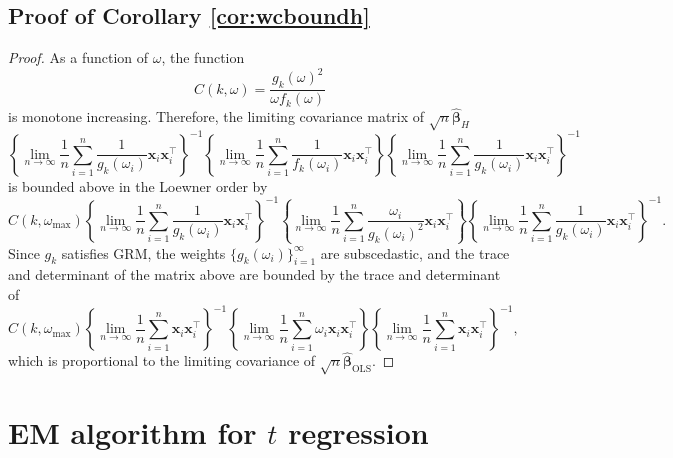 \documentclass[12pt]{article}
\newcommand{\bl}[1]{{\mathbf #1}}
\newcommand{\bs}[1]{\boldsymbol #1}
\begin{document}
\subsection{{Proof of Corollary \ref{cor:wcboundh}}}

\begin{proof}
    As a function of $\omega$, the function
    \begin{equation*}
        C(k, \omega) =\frac{g_{k}(\omega)^2}{\omega f_{k}(\omega)}
    \end{equation*}
    is monotone increasing. Therefore, the limiting covariance matrix of $\sqrt{n}\hat{\bs{\beta}}_H$
    \begin{equation*}
        \left\{ \lim_{n \rightarrow \infty} \frac{1}{n} \sum_{i=1}^n \frac{1}{g_{k}(\omega_i)} \bl{x}_i \bl{x}_i^\top \right\}^{-1} \left\{ \lim_{n \rightarrow \infty} \frac{1}{n} \sum_{i=1}^n \frac{1}{f_{k}(\omega_i)} \bl{x}_i \bl{x}_i^\top \right\} \left\{ \lim_{n \rightarrow \infty} \frac{1}{n} \sum_{i=1}^n \frac{1}{g_{k}(\omega_i)} \bl{x}_i \bl{x}_i^\top \right\}^{-1}
    \end{equation*}
    is bounded above in the Loewner order by
    \small{\begin{equation*}
        C(k, \omega_{\max})\left\{ \lim_{n \rightarrow \infty} \frac{1}{n} \sum_{i=1}^n \frac{1}{g_{k}(\omega_i)} \bl{x}_i \bl{x}_i^\top \right\}^{-1} \left\{ \lim_{n \rightarrow \infty} \frac{1}{n} \sum_{i=1}^n \frac{\omega_i}{g_{k}(\omega_i)^2} \bl{x}_i \bl{x}_i^\top \right\} \left\{ \lim_{n \rightarrow \infty} \frac{1}{n} \sum_{i=1}^n \frac{1}{g_{k}(\omega_i)} \bl{x}_i \bl{x}_i^\top \right\}^{-1}.
    \end{equation*}}
    Since $g_{k}$ satisfies GRM, the weights $\{g_{k}(\omega_i)\}_{i=1}^\infty$ are subscedastic, and the trace and determinant of the matrix above are bounded by the trace and determinant of
    \begin{equation*}
        C(k, \omega_{\max})\left\{ \lim_{n \rightarrow \infty} \frac{1}{n} \sum_{i=1}^n \bl{x}_i \bl{x}_i^\top \right\}^{-1} \left\{ \lim_{n \rightarrow \infty} \frac{1}{n} \sum_{i=1}^n \omega_i \bl{x}_i \bl{x}_i^\top \right\} \left\{ \lim_{n \rightarrow \infty} \frac{1}{n} \sum_{i=1}^n \bl{x}_i \bl{x}_i^\top \right\}^{-1},
    \end{equation*}
    which is proportional to the limiting covariance of $\sqrt{n}\hat{\bs{\beta}}_{\mathrm{OLS}}$.
\end{proof}

\section{EM algorithm for $t$ regression}\label{asec:em}
\end{document}
